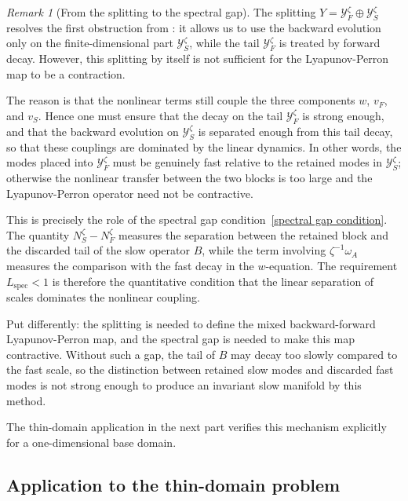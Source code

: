 \documentclass[11pt]{article}
\theoremstyle{definition}
\theoremstyle{remark}
\newtheorem{remark}[theorem]{Remark}
\numberwithin{equation}{section}
\newcommand{\mc}[1]{\mathcal{#1}}
\begin{document}
\begin{remark}[From the splitting to the spectral gap]
    The splitting $Y=\mc Y_F^\zeta\oplus \mc Y_S^\zeta$ resolves the first obstruction from : it allows us to use the backward evolution only on the finite-dimensional part $\mc Y_S^\zeta$, while the tail $\mc Y_F^\zeta$ is treated by forward decay. However, this splitting by itself is not sufficient for the Lyapunov-Perron map to be a contraction.

    The reason is that the nonlinear terms still couple the three components $w$, $v_F$, and $v_S$. Hence one must ensure that the decay on the tail $\mc Y_F^\zeta$ is strong enough, and that the backward evolution on $\mc Y_S^\zeta$ is separated enough from this tail decay, so that these couplings are dominated by the linear dynamics. In other words, the modes placed into $\mc Y_F^\zeta$ must be genuinely fast relative to the retained modes in $\mc Y_S^\zeta$; otherwise the nonlinear transfer between the two blocks is too large and the Lyapunov-Perron operator need not be contractive.

    This is precisely the role of the spectral gap condition~\eqref{spectral gap condition}. The quantity $N_S^\zeta-N_F^\zeta$ measures the separation between the retained block and the discarded tail of the slow operator $B$, while the term involving $\zeta^{-1}\omega_A$ measures the comparison with the fast decay in the $w$-equation. The requirement $L_{\mathrm{spec}}<1$ is therefore the quantitative condition that the linear separation of scales dominates the nonlinear coupling.

    Put differently: the splitting is needed to define the mixed backward-forward Lyapunov-Perron map, and the spectral gap is needed to make this map contractive. Without such a gap, the tail of $B$ may decay too slowly compared to the fast scale, so the distinction between retained slow modes and discarded fast modes is not strong enough to produce an invariant slow manifold by this method.

    The thin-domain application in the next part verifies this mechanism explicitly for a one-dimensional base domain.
\end{remark}

\subsection{Application to the thin-domain problem}
\label{subsec:thin-domain-application}
\end{document}
